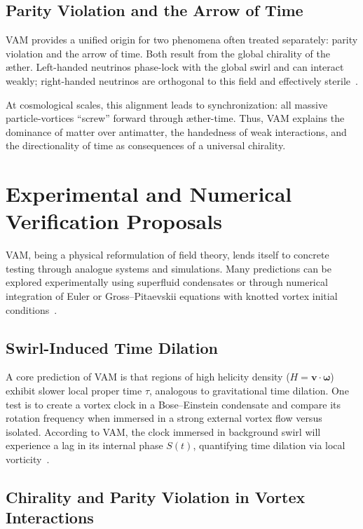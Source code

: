 \documentclass[11pt]{article}
\begin{document}
\subsection*{Parity Violation and the Arrow of Time}

VAM provides a unified origin for two phenomena often treated separately: parity violation and the arrow of time. Both result from the global chirality of the æther. Left-handed neutrinos phase-lock with the global swirl and can interact weakly; right-handed neutrinos are orthogonal to this field and effectively sterile~\cite{iskandarani2025vam5}.

At cosmological scales, this alignment leads to synchronization: all massive particle-vortices “screw” forward through æther-time. Thus, VAM explains the dominance of matter over antimatter, the handedness of weak interactions, and the directionality of time as consequences of a universal chirality.

\bigskip

\section*{Experimental and Numerical Verification Proposals}

VAM, being a physical reformulation of field theory, lends itself to concrete testing through analogue systems and simulations. Many predictions can be explored experimentally using superfluid condensates or through numerical integration of Euler or Gross–Pitaevskii equations with knotted vortex initial conditions~\cite{iskandarani2025vam5}.

\subsection*{Swirl-Induced Time Dilation}

A core prediction of VAM is that regions of high helicity density ($H = \mathbf{v} \cdot \boldsymbol{\omega}$) exhibit slower local proper time $\tau$, analogous to gravitational time dilation. One test is to create a vortex clock in a Bose–Einstein condensate and compare its rotation frequency when immersed in a strong external vortex flow versus isolated. According to VAM, the clock immersed in background swirl will experience a lag in its internal phase $S(t)$, quantifying time dilation via local vorticity~\cite{iskandarani2025vam5}.

\subsection*{Chirality and Parity Violation in Vortex Interactions}
\end{document}
